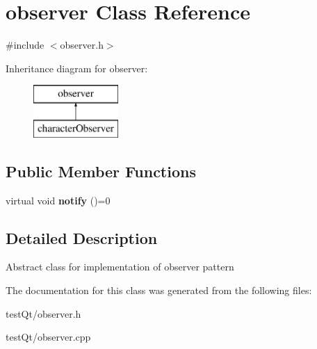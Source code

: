 \hypertarget{classobserver}{}\section{observer Class Reference}
\label{classobserver}


{\ttfamily \#include $<$observer.\+h$>$}

Inheritance diagram for observer\+:\begin{figure}[H]
\begin{center}
\leavevmode
\includegraphics[height=2.000000cm]{classobserver}
\end{center}
\end{figure}
\subsection*{Public Member Functions}
\begin{DoxyCompactItemize}
\item 
\hypertarget{classobserver_a598c062264bb62e6e74a5b187c7bcfa7}{}\label{classobserver_a598c062264bb62e6e74a5b187c7bcfa7} 
virtual void {\bfseries notify} ()=0
\end{DoxyCompactItemize}


\subsection{Detailed Description}
Abstract class for implementation of observer pattern 

The documentation for this class was generated from the following files\+:\begin{DoxyCompactItemize}
\item 
test\+Qt/observer.\+h\item 
test\+Qt/observer.\+cpp\end{DoxyCompactItemize}
